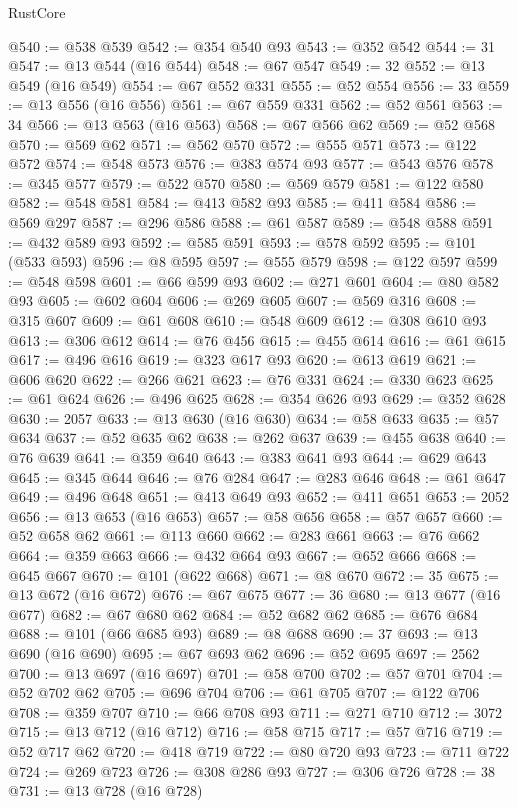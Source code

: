 \begin{lexlean}{RustCore}
\begin{coremodule}
@540 := @538 @539
@542 := @354 @540 @93
@543 := @352 @542
@544 := 31
@547 := @13 @544 (@16 @544)
@548 := @67 @547
@549 := 32
@552 := @13 @549 (@16 @549)
@554 := @67 @552 @331
@555 := @52 @554
@556 := 33
@559 := @13 @556 (@16 @556)
@561 := @67 @559 @331
@562 := @52 @561
@563 := 34
@566 := @13 @563 (@16 @563)
@568 := @67 @566 @62
@569 := @52 @568
@570 := @569 @62
@571 := @562 @570
@572 := @555 @571
@573 := @122 @572
@574 := @548 @573
@576 := @383 @574 @93
@577 := @543 @576
@578 := @345 @577
@579 := @522 @570
@580 := @569 @579
@581 := @122 @580
@582 := @548 @581
@584 := @413 @582 @93
@585 := @411 @584
@586 := @569 @297
@587 := @296 @586
@588 := @61 @587
@589 := @548 @588
@591 := @432 @589 @93
@592 := @585 @591
@593 := @578 @592
@595 := @101 (@533 @593)
@596 := @8 @595
@597 := @555 @579
@598 := @122 @597
@599 := @548 @598
@601 := @66 @599 @93
@602 := @271 @601
@604 := @80 @582 @93
@605 := @602 @604
@606 := @269 @605
@607 := @569 @316
@608 := @315 @607
@609 := @61 @608
@610 := @548 @609
@612 := @308 @610 @93
@613 := @306 @612
@614 := @76 @456
@615 := @455 @614
@616 := @61 @615
@617 := @496 @616
@619 := @323 @617 @93
@620 := @613 @619
@621 := @606 @620
@622 := @266 @621
@623 := @76 @331
@624 := @330 @623
@625 := @61 @624
@626 := @496 @625
@628 := @354 @626 @93
@629 := @352 @628
@630 := 2057
@633 := @13 @630 (@16 @630)
@634 := @58 @633
@635 := @57 @634
@637 := @52 @635 @62
@638 := @262 @637
@639 := @455 @638
@640 := @76 @639
@641 := @359 @640
@643 := @383 @641 @93
@644 := @629 @643
@645 := @345 @644
@646 := @76 @284
@647 := @283 @646
@648 := @61 @647
@649 := @496 @648
@651 := @413 @649 @93
@652 := @411 @651
@653 := 2052
@656 := @13 @653 (@16 @653)
@657 := @58 @656
@658 := @57 @657
@660 := @52 @658 @62
@661 := @113 @660
@662 := @283 @661
@663 := @76 @662
@664 := @359 @663
@666 := @432 @664 @93
@667 := @652 @666
@668 := @645 @667
@670 := @101 (@622 @668)
@671 := @8 @670
@672 := 35
@675 := @13 @672 (@16 @672)
@676 := @67 @675
@677 := 36
@680 := @13 @677 (@16 @677)
@682 := @67 @680 @62
@684 := @52 @682 @62
@685 := @676 @684
@688 := @101 (@66 @685 @93)
@689 := @8 @688
@690 := 37
@693 := @13 @690 (@16 @690)
@695 := @67 @693 @62
@696 := @52 @695
@697 := 2562
@700 := @13 @697 (@16 @697)
@701 := @58 @700
@702 := @57 @701
@704 := @52 @702 @62
@705 := @696 @704
@706 := @61 @705
@707 := @122 @706
@708 := @359 @707
@710 := @66 @708 @93
@711 := @271 @710
@712 := 3072
@715 := @13 @712 (@16 @712)
@716 := @58 @715
@717 := @57 @716
@719 := @52 @717 @62
@720 := @418 @719
@722 := @80 @720 @93
@723 := @711 @722
@724 := @269 @723
@726 := @308 @286 @93
@727 := @306 @726
@728 := 38
@731 := @13 @728 (@16 @728)

\end{coremodule}
\end{lexlean}
